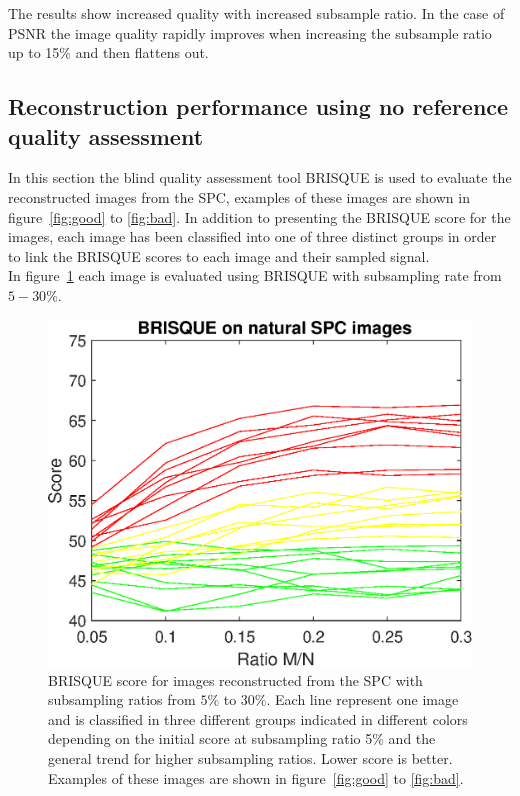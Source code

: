 The results show increased quality with increased subsample ratio. In the case of PSNR the image quality rapidly improves when increasing the subsample ratio up to 15\% and then flattens out. 



\subsection{Reconstruction performance using no reference quality assessment}
\label{sec:SPC_BRISQUE}
In this section the blind quality assessment tool BRISQUE is used to evaluate the reconstructed images from the SPC, examples of these images are shown in figure~\ref{fig:good} to \ref{fig:bad}. In addition to presenting the BRISQUE score for the images, each image has been classified into one of three distinct groups in order to link the BRISQUE scores to each image and their sampled signal.\\[0.1in] 

In figure~\ref{fig:brisque_plot} each image is evaluated using BRISQUE with subsampling rate from $5-30\%$.

\begin{figure}[H]
    \centering
    \includegraphics[width = 0.7\linewidth]{result/SPC_NRQA/brisque_spc.eps}
    \caption{BRISQUE score for images reconstructed from the SPC with subsampling ratios from $5\%$ to $30\%$. Each line represent one image and is classified in three different groups indicated in different colors depending on the initial score at subsampling ratio 5\% and the general trend for higher subsampling ratios. Lower score is better. Examples of these images are shown in figure~\ref{fig:good} to \ref{fig:bad}.}
    \label{fig:brisque_plot}
\end{figure}


